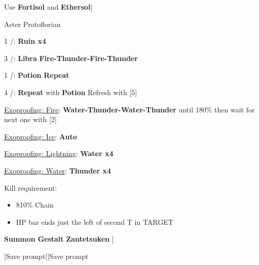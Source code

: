 \begin{mainlist}
	\item Use \textbf{Fortisol} and \textbf{Ethersol}|\skip
\end{mainlist}
\begin{fight}{Aster Protoflorian}
	\item [1] \com/\rav: \textbf{Ruin x4}
	\item [3] \rav/\syn: \textbf{Libra} \to \textbf{Fire-Thunder-Fire-Thunder}
	\item [1] \com/\rav: \textbf{\textbf{Potion}} \to \textbf{Repeat}
	\item [4] \rav/\rav: \textbf{Repeat} with \textbf{Potion} \to Refresh with [5]
	\item \underline{Exoproofing: Fire}: \textbf{Water-Thunder-Water-Thunder} until 180\% then wait for next one with [2]
	\item \underline{Exoproofing: Ice}: \textbf{Auto}
	\item \underline{Exoproofing: Lightning}: \textbf{Water x4}
	\item \underline{Exoproofing: Water}: \textbf{Thunder x4}
	\item Kill requirement:
	\begin{itemize}
		\item 810\% Chain
		\item HP bar ends just the left of second T in TARGET
	\end{itemize}
	\item \textbf{Summon} \to \textbf{Gestalt} \to \textbf{Zantetsuken} |\skip
\end{fight}
\begin{mainlist}
	\item \skip|Save prompt||Save prompt
\end{mainlist}
